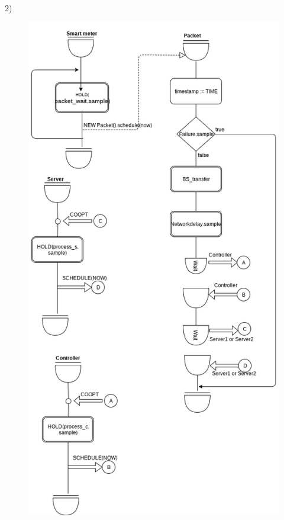 \documentclass[11pt]{article}
\begin{document}
\newpage

2) 

\begin{figure}[H]
	\includegraphics[width=\textwidth,height=0.9\textheight,keepaspectratio]{activiy_diagram1.png}
	\centering
\end{figure}
\end{document}
